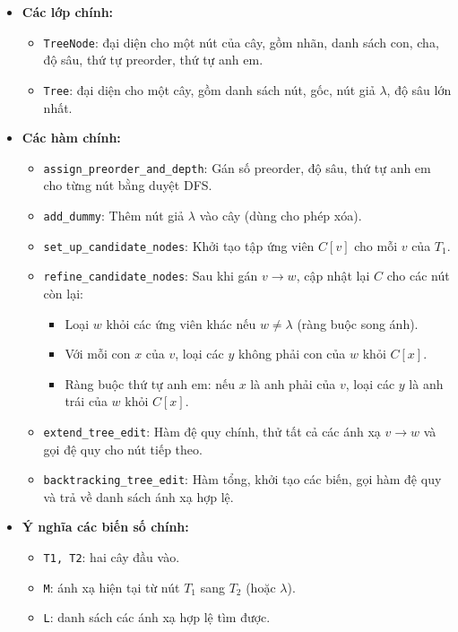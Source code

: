 \documentclass{article}
\begin{document}
\begin{itemize}
    \item \textbf{Các lớp chính:}
    \begin{itemize}
        \item \texttt{TreeNode}: đại diện cho một nút của cây, gồm nhãn, danh sách con, cha, độ sâu, thứ tự preorder, thứ tự anh em.
        \item \texttt{Tree}: đại diện cho một cây, gồm danh sách nút, gốc, nút giả $\lambda$, độ sâu lớn nhất.
    \end{itemize}
    \item \textbf{Các hàm chính:}
    \begin{itemize}
        \item \texttt{assign\_preorder\_and\_depth}: Gán số preorder, độ sâu, thứ tự anh em cho từng nút bằng duyệt DFS.
        \item \texttt{add\_dummy}: Thêm nút giả $\lambda$ vào cây (dùng cho phép xóa).
        \item \texttt{set\_up\_candidate\_nodes}: Khởi tạo tập ứng viên $C[v]$ cho mỗi $v$ của $T_1$.
        \item \texttt{refine\_candidate\_nodes}: Sau khi gán $v \to w$, cập nhật lại $C$ cho các nút còn lại:
        \begin{itemize}
            \item Loại $w$ khỏi các ứng viên khác nếu $w \neq \lambda$ (ràng buộc song ánh).
            \item Với mỗi con $x$ của $v$, loại các $y$ không phải con của $w$ khỏi $C[x]$.
            \item Ràng buộc thứ tự anh em: nếu $x$ là anh phải của $v$, loại các $y$ là anh trái của $w$ khỏi $C[x]$.
        \end{itemize}
        \item \texttt{extend\_tree\_edit}: Hàm đệ quy chính, thử tất cả các ánh xạ $v \to w$ và gọi đệ quy cho nút tiếp theo.
        \item \texttt{backtracking\_tree\_edit}: Hàm tổng, khởi tạo các biến, gọi hàm đệ quy và trả về danh sách ánh xạ hợp lệ.
    \end{itemize}
    \item \textbf{Ý nghĩa các biến số chính:}
    \begin{itemize}
        \item \texttt{T1, T2}: hai cây đầu vào.
        \item \texttt{M}: ánh xạ hiện tại từ nút $T_1$ sang $T_2$ (hoặc $\lambda$).
        \item \texttt{L}: danh sách các ánh xạ hợp lệ tìm được.

\end{itemize}
\end{itemize}
\end{document}
